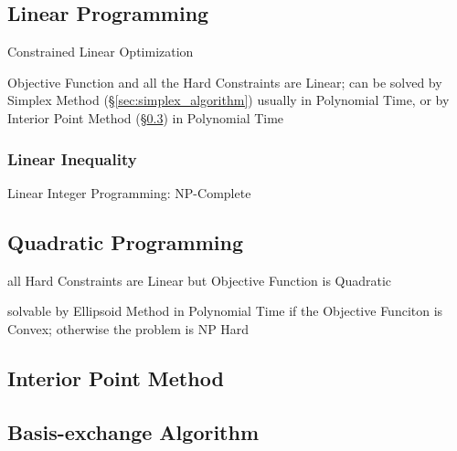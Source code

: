 \subsection{Linear Programming}\label{sec:linear_programming}

Constrained Linear Optimization

Objective Function and all the Hard Constraints are Linear; can be solved by
Simplex Method (\S\ref{sec:simplex_algorithm}) usually in Polynomial Time, or
by Interior Point Method (\S\ref{sec:interior_point}) in Polynomial Time



\subsubsection{Linear Inequality}\label{sec:linear_inequality}

Linear Integer Programming: NP-Complete



\subsection{Quadratic Programming}\label{sec:quadratic_programming}

all Hard Constraints are Linear but Objective Function is Quadratic

solvable by Ellipsoid Method in Polynomial Time if the Objective Funciton is
Convex; otherwise the problem is NP Hard



\subsection{Interior Point Method}\label{sec:interior_point}

\subsection{Basis-exchange Algorithm}\label{sec:basis_exchange}

